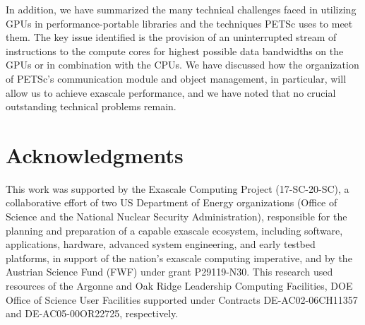 \documentclass[5p,times]{elsarticle}
\begin{document}
In addition, we have summarized the many technical
challenges faced in utilizing GPUs in performance-portable libraries and the techniques PETSc uses to meet them.
The key issue identified is the provision of an uninterrupted stream of instructions to the compute cores for highest possible data
bandwidths on the GPUs or in combination with the CPUs. We have discussed how the organization of PETSc's communication module
and object management, in particular, will allow us to achieve exascale performance, and we have noted that no crucial outstanding technical problems remain.


\section*{Acknowledgments}
\noindent
This work was supported by the Exascale Computing Project (17-SC-20-SC), a collaborative 
effort of two US Department of Energy organizations (Office of Science and the National
Nuclear Security Administration), responsible for the planning and preparation
of a capable exascale ecosystem, including software, applications, hardware,
advanced system engineering, and early testbed platforms, in support of the
nation’s exascale computing imperative, and by the Austrian Science Fund (FWF) under grant P29119-N30.  This research used resources of the 
Argonne and Oak Ridge Leadership Computing Facilities, DOE Office of Science 
User Facilities supported under Contracts DE-AC02-06CH11357 and 
DE-AC05-00OR22725, respectively.



\clearpage
\onecolumn
\centering
{}
\end{document}
